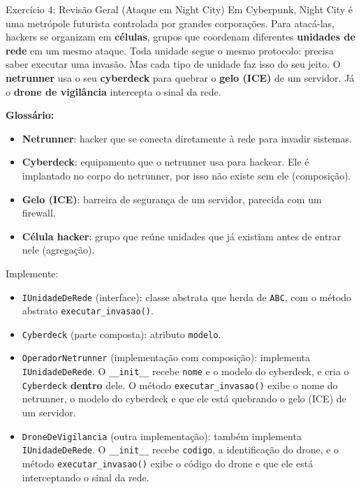 \begin{exercicio}{Exercício 4: Revisão Geral (Ataque em Night City)}
Em Cyberpunk, Night City é uma metrópole futurista controlada por grandes corporações. Para
atacá-las, hackers se organizam em \textbf{células}, grupos que coordenam diferentes
\textbf{unidades de rede} em um mesmo ataque. Toda unidade segue o mesmo protocolo: precisa
saber executar uma invasão. Mas cada tipo de unidade faz isso do seu jeito. O
\textbf{netrunner} usa o seu \textbf{cyberdeck} para quebrar o \textbf{gelo (ICE)} de um
servidor. Já o \textbf{drone de vigilância} intercepta o sinal da rede.

\textbf{Glossário:}
\begin{itemize}
    \item \textbf{Netrunner}: hacker que se conecta diretamente à rede para invadir sistemas.
    \item \textbf{Cyberdeck}: equipamento que o netrunner usa para hackear. Ele é implantado
    no corpo do netrunner, por isso não existe sem ele (composição).
    \item \textbf{Gelo (ICE)}: barreira de segurança de um servidor, parecida com um firewall.
    \item \textbf{Célula hacker}: grupo que reúne unidades que já existiam antes de entrar nele
    (agregação).
\end{itemize}

Implemente:

\begin{itemize}
    \item \texttt{IUnidadeDeRede} (interface): classe abstrata que herda de \texttt{ABC}, com
    o método abstrato \texttt{executar\_invasao()}.

    \item \texttt{Cyberdeck} (parte composta): atributo \texttt{modelo}.

    \item \texttt{OperadorNetrunner} (implementação com composição): implementa
    \texttt{IUnidadeDeRede}. O \texttt{\_\_init\_\_} recebe \texttt{nome} e o modelo do
    cyberdeck, e cria o \texttt{Cyberdeck} \textbf{dentro} dele. O método
    \texttt{executar\_invasao()} exibe o nome do netrunner, o modelo do cyberdeck e que ele
    está quebrando o gelo (ICE) de um servidor.

    \item \texttt{DroneDeVigilancia} (outra implementação): também implementa
    \texttt{IUnidadeDeRede}. O \texttt{\_\_init\_\_} recebe \texttt{codigo}, a identificação
    do drone, e o método \texttt{executar\_invasao()} exibe o código do drone e que ele está
    interceptando o sinal da rede.


\end{itemize}
\end{exercicio}
